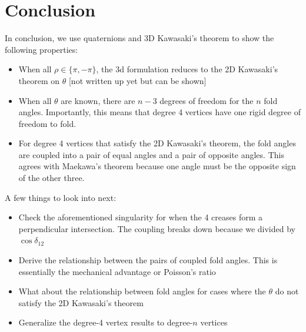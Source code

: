 \documentclass[11pt]{article}
\begin{document}
\section{Conclusion}
In conclusion, we use quaternions and 3D Kawasaki's theorem to show the following properties:
\begin{itemize}
    \item When all $\rho\in \{\pi,-\pi\}$, the 3d formulation reduces to the 2D Kawasaki's theorem on $\theta$ [not written up yet but can be shown]
    \item When all $\theta$ are known, there are $n-3$ degrees of freedom for the $n$ fold angles. Importantly, this means that degree 4 vertices have one rigid degree of freedom to fold.
    \item For degree 4 vertices that satisfy the 2D Kawasaki's theorem, the fold angles are coupled into a pair of equal angles and a pair of opposite angles. This agrees with Maekawa's theorem because one angle must be the opposite sign of the other three.
\end{itemize}
A few things to look into next:
\begin{itemize}
    \item Check the aforementioned singularity for when the 4 creases form a perpendicular intersection. The coupling breaks down because we divided by $\cos \delta_{12}$ 
    \item Derive the relationship between the pairs of coupled fold angles. This is essentially the mechanical advantage or Poisson's ratio
    \item What about the relationship between fold angles for cases where the $\theta$ do not satisfy the 2D Kawasaki's theorem
    \item Generalize the degree-4 vertex results to degree-$n$ vertices
\end{itemize}
\end{document}
